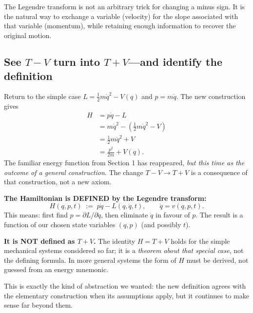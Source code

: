 \documentclass[11pt,a4paper,oneside]{article}
\begin{document}
\begin{intuition}
The Legendre transform is not an arbitrary trick for changing a minus sign. It is the natural way to exchange a variable (velocity) for the slope associated with that variable (momentum), while retaining enough information to recover the original motion.
\end{intuition}

\subsection{See $T-V$ turn into $T+V$---and identify the definition}
Return to the simple case $L=\tfrac12m\dot q^2-V(q)$ and $p=m\dot q$. The new construction gives
\begin{align*}
 H&=p\dot q-L\\
  &=m\dot q^2-\left(\tfrac12m\dot q^2-V\right)\\
  &=\tfrac12m\dot q^2+V\\
  &=\boxed{\frac{p^2}{2m}+V(q)}.
\end{align*}
The familiar energy function from Section 1 has reappeared, \emph{but this time as the outcome of a general construction}. The change $T-V\to T+V$ is a consequence of that construction, not a new axiom.

\begin{pausebox}[title={\strut Essential definition---do not confuse it with a special-case result},boxrule=1.15pt,colframe=gold!85!black,colback=sand!95!white]
\textbf{The Hamiltonian is DEFINED by the Legendre transform:}
\begin{equation}\label{eq:hamdefemphasis}
\boxed{\displaystyle H(q,p,t)\;:=\;p\dot q-L(q,\dot q,t),
\qquad\dot q=v(q,p,t).}
\end{equation}
This means: first find $p=\partial L/\partial\dot q$, then eliminate $\dot q$ in favour of $p$. The result is a function of our chosen state variables $(q,p)$ (and possibly $t$).

\textbf{It is NOT defined as $T+V$.} The identity $H=T+V$ holds for the simple mechanical systems considered so far; it is a \emph{theorem about that special case}, not the defining formula. In more general systems the form of $H$ must be derived, not guessed from an energy mnemonic.

This is exactly the kind of abstraction we wanted: the new definition agrees with the elementary construction when its assumptions apply, but it continues to make sense far beyond them.
\end{pausebox}
\end{document}
